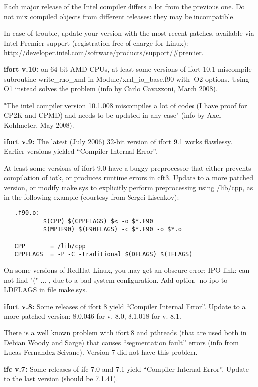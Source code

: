 \documentclass[12pt,a4paper]{article}
\begin{document}
Each major release of the Intel compiler diﬀers a lot from the previous one.
Do not mix compiled objects from different releases: they may be incompatible.
    
In case of trouble, update your version with the most recent patches,
available via Intel Premier support (registration free of charge for Linux):
http://developer.intel.com/software/products/support/\#premier.

{\bf ifort v.10:} on 64-bit AMD CPUs, at least some versions of ifort 10.1 
miscompile subroutine write\_rho\_xml in Module/xml\_io\_base.f90 with -O2
options. Using -O1 instead solves the problem (info by Carlo
Cavazzoni, March 2008). 

"The intel compiler version 10.1.008 miscompiles a lot of codes (I have proof 
for CP2K and CPMD) and needs to be updated in any case" (info by Axel
Kohlmeter, May 2008).
 
{\bf ifort v.9:} The latest (July 2006) 32-bit version of ifort 9.1
works flawlessy. Earlier versions yielded “Compiler Internal Error”.

At least some versions of ifort 9.0 have a buggy preprocessor that either
prevents compilation of iotk, or produces runtime errors in cft3. Update
to a more patched version, or modify make.sys to explicitly perform 
preprocessing using /lib/cpp, as in the following example (courtesy from Sergei
Lisenkov):
\begin{verbatim}
   .f90.o:
           $(CPP) $(CPPFLAGS) $< -o $*.F90
           $(MPIF90) $(F90FLAGS) -c $*.F90 -o $*.o

   CPP       = /lib/cpp
   CPPFLAGS  = -P -C -traditional $(DFLAGS) $(IFLAGS)
\end{verbatim}
    
On some versions of RedHat Linux, you may get an obscure error: IPO
link: can not find "(" ... , due to a bad system configuration. Add
option -no-ipo to LDFLAGS in ﬁle make.sys.

{\bf ifort v.8:} Some releases of ifort 8 yield “Compiler Internal
Error”. Update to a more patched version: 8.0.046 for v. 8.0, 8.1.018
for v. 8.1. 

There is a well known problem with ifort 8 and pthreads (that are used
both in Debian Woody and Sarge) that causes “segmentation fault” errors
(info from Lucas Fernandez Seivane). Version 7 did not have this problem.

{\bf ifc v.7:} Some releases of ifc 7.0 and 7.1 yield “Compiler
Internal Error”. Update to the last version (should be 7.1.41).
\end{document}
